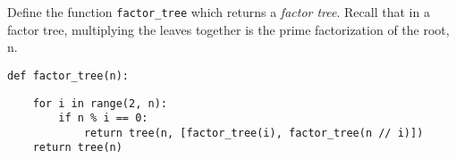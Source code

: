 \begin{blocksection}
\question Define the function \lstinline$factor_tree$ which returns a \emph{factor tree}. Recall that in a factor tree, multiplying the leaves together is the prime factorization of the root, n.

\begin{center}
\end{center}

\begin{lstlisting}
def factor_tree(n):
\end{lstlisting}

\begin{solution}[1.5in]
\begin{lstlisting}
    for i in range(2, n):
        if n % i == 0:
            return tree(n, [factor_tree(i), factor_tree(n // i)])
    return tree(n)
\end{lstlisting}
\end{solution}
\end{blocksection}
